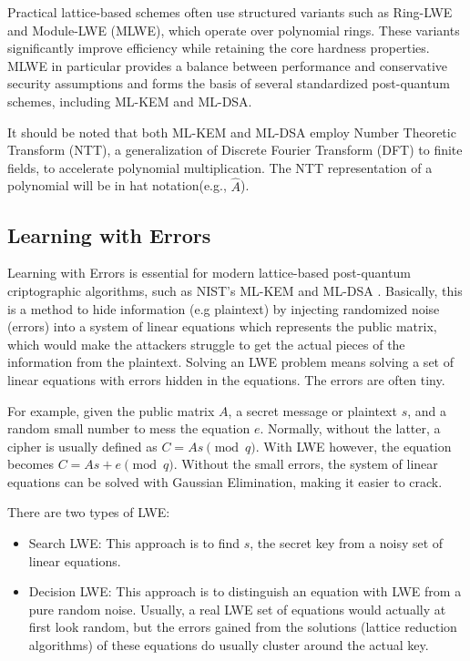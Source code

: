 Practical lattice-based schemes often use structured variants such as Ring-LWE and Module-LWE (MLWE), which operate over polynomial rings. These variants significantly improve efficiency while retaining the core hardness properties. MLWE in particular provides a balance between performance and conservative security assumptions and forms the basis of several standardized post-quantum schemes, including ML-KEM and ML-DSA. 

It should be noted that both ML-KEM and ML-DSA employ Number Theoretic Transform (NTT), a generalization of Discrete Fourier Transform (DFT) to finite fields, to accelerate polynomial multiplication. The NTT representation of a polynomial will be in hat notation(e.g., $\hat{A}$).

\subsection{Learning with Errors}
\mbox{}
Learning with Errors is essential for modern lattice-based post-quantum criptographic algorithms, such as NIST's ML-KEM and ML-DSA \cite{11}. Basically, this is a method to hide information (e.g plaintext) by injecting randomized noise (errors) into a system of linear equations which represents the public matrix, which would make the attackers struggle to get the actual pieces of the information from the plaintext. Solving an LWE problem means solving a set of linear equations with errors hidden in the equations. The errors are often tiny. 

For example, given the public matrix $A$, a secret message or plaintext $s$, and a random small number to mess the equation $e$. Normally, without the latter, a cipher is usually defined as $C = As \pmod q$. With LWE however, the equation becomes $C = As + e \pmod q$. Without the small errors, the system of linear equations can be solved with Gaussian Elimination, making it easier to crack. 

There are two types of LWE: 
\begin{itemize}
\raggedright
\item Search LWE: This approach is to find $s$, the secret key from a noisy set of linear equations. 

\item Decision LWE: This approach is to distinguish an equation with LWE from a pure random noise. Usually, a real LWE set of equations would actually at first look random, but the errors gained from the solutions (lattice reduction algorithms) of these equations do usually cluster around the actual key. 
\end{itemize}

